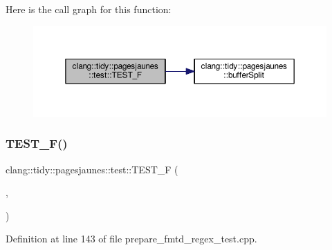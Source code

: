 Here is the call graph for this function\+:
\nopagebreak
\begin{figure}[H]
\begin{center}
\leavevmode
\includegraphics[width=350pt]{namespaceclang_1_1tidy_1_1pagesjaunes_1_1test_a16c0b3f2dcc4de39bf59735e18c9611c_cgraph}
\end{center}
\end{figure}
\mbox{\label{namespaceclang_1_1tidy_1_1pagesjaunes_1_1test_a04a3722c20f4f679ebd39cac4a0af451}} 
\subsubsection{\texorpdfstring{T\+E\+S\+T\+\_\+\+F()}{TEST\_F()}\hspace{0.1cm}{\footnotesize\ttfamily [34/57]}}
{\footnotesize\ttfamily clang\+::tidy\+::pagesjaunes\+::test\+::\+T\+E\+S\+T\+\_\+F (\begin{DoxyParamCaption}\item[{\hyperlink{classclang_1_1tidy_1_1pagesjaunes_1_1test_1_1_prepare_fmtd_regex_test}{Prepare\+Fmtd\+Regex\+Test}}]{,  }\item[{Regex\+Matching\+Weird\+Syntax}]{ }\end{DoxyParamCaption})}



Definition at line 143 of file prepare\+\_\+fmtd\+\_\+regex\+\_\+test.\+cpp.

